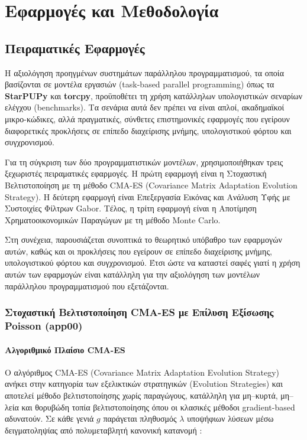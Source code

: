 
\chapter{Εφαρμογές και Μεθοδολογία}   

\section{Πειραματικές Εφαρμογές}

Η αξιολόγηση προηγμένων συστημάτων παράλληλου προγραμματισμού, τα οποία βασίζονται σε μοντέλα εργασιών (task-based parallel programming) όπως τα \textbf{StarPUPy} και \textbf{torcpy}, προϋποθέτει τη χρήση κατάλληλων υπολογιστικών σεναρίων ελέγχου (benchmarks). Τα σενάρια αυτά δεν πρέπει να είναι απλοί, ακαδημαϊκοί μικρο-κώδικες, αλλά πραγματικές, σύνθετες επιστημονικές εφαρμογές που εγείρουν διαφορετικές προκλήσεις σε επίπεδο διαχείρισης μνήμης, υπολογιστικού φόρτου και συγχρονισμού.

Για τη σύγκριση των δύο προγραμματιστικών μοντέλων, χρησιμοποιήθηκαν τρεις ξεχωριστές πειραματικές εφαρμογές. Η πρώτη εφαρμογή είναι η Στοχαστική Βελτιστοποίηση με τη μέθοδο CMA-ES (Covariance Matrix Adaptation Evolution Strategy). Η δεύτερη εφαρμογή είναι Επεξεργασία Εικόνας και Ανάλυση Υφής με Συστοιχίες Φίλτρων Gabor. Τέλος, η τρίτη εφαρμογή είναι η Αποτίμηση Χρηματοοικονομικών Παραγώγων με τη μέθοδο Monte Carlo.

Στη συνέχεια, παρουσιάζεται συνοπτικά το θεωρητικό υπόβαθρο των εφαρμογών αυτών, καθώς και οι προκλήσεις που εγείρουν σε επίπεδο διαχείρισης μνήμης, υπολογιστικού φόρτου και συγχρονισμού. Έτσι ώστε να καταστεί σαφές γιατί η χρήση αυτών των εφαρμογών είναι κατάλληλη για την αξιολόγηση των μοντέλων παράλληλου προγραμματισμού που εξετάζονται.

\subsection{Στοχαστική Βελτιστοποίηση CMA-ES με Επίλυση Εξίσωσης Poisson (app00)}

\subsubsection{Αλγοριθμικό Πλαίσιο CMA-ES}

Ο αλγόριθμος CMA-ES (Covariance Matrix Adaptation Evolution Strategy) ανήκει στην κατηγορία των εξελικτικών στρατηγικών (Evolution Strategies) και αποτελεί μέθοδο βελτιστοποίησης χωρίς παραγώγους, κατάλληλη για μη--κυρτά, μη--λεία και θορυβώδη τοπία βελτιστοποίησης όπου οι κλασικές μέθοδοι gradient-based αδυνατούν. Σε κάθε γενιά $g$ παράγεται πληθυσμός $\lambda$ υποψήφιων λύσεων μέσω δειγματοληψίας από πολυμεταβλητή κανονική κατανομή \cite{HansenGECCO2014,Hansen2016,HansenCopenhagen,WikiCMAES}:


